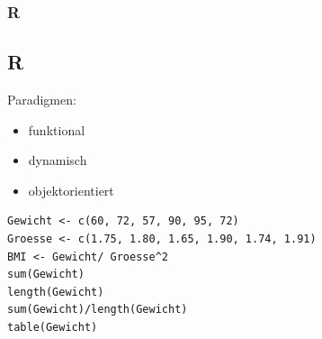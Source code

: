 \documentclass[11pt]{beamer}
\begin{document}

\begin{frame}[fragile]
\frametitle{R}
\subsection{R}
Paradigmen:
\begin{itemize}
	\item funktional
	\item dynamisch
	\item objektorientiert
\end{itemize}


\lstset{
	language=R,
	basicstyle=\footnotesize,
	numbers=left,
	numbersep=5pt,
	showtabs=false,
	title=R Beispiel Code,
	style=customc
}
\begin{lstlisting}
Gewicht <- c(60, 72, 57, 90, 95, 72)
Groesse <- c(1.75, 1.80, 1.65, 1.90, 1.74, 1.91)
BMI <- Gewicht/ Groesse^2
sum(Gewicht)
length(Gewicht)
sum(Gewicht)/length(Gewicht)
table(Gewicht)
\end{lstlisting}

\end{frame}
\end{document}
